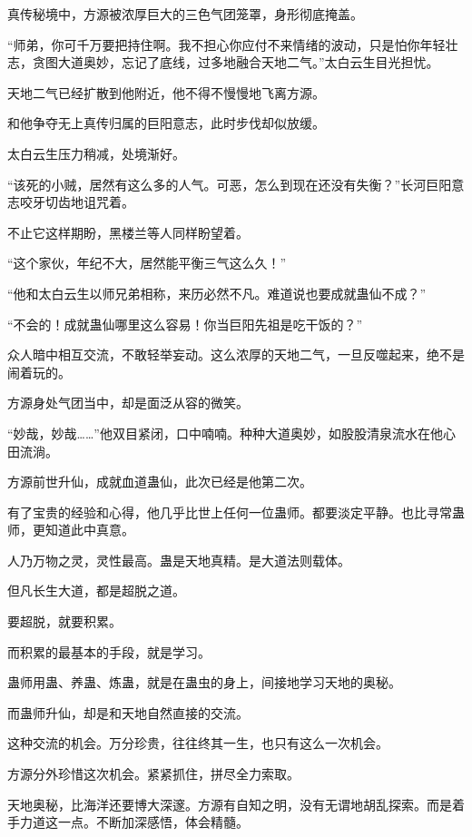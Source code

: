 
\begin{this_body}

真传秘境中，方源被浓厚巨大的三色气团笼罩，身形彻底掩盖。

“师弟，你可千万要把持住啊。我不担心你应付不来情绪的波动，只是怕你年轻壮志，贪图大道奥妙，忘记了底线，过多地融合天地二气。”太白云生目光担忧。

天地二气已经扩散到他附近，他不得不慢慢地飞离方源。

和他争夺无上真传归属的巨阳意志，此时步伐却似放缓。

太白云生压力稍减，处境渐好。

“该死的小贼，居然有这么多的人气。可恶，怎么到现在还没有失衡？”长河巨阳意志咬牙切齿地诅咒着。

不止它这样期盼，黑楼兰等人同样盼望着。

“这个家伙，年纪不大，居然能平衡三气这么久！”

“他和太白云生以师兄弟相称，来历必然不凡。难道说也要成就蛊仙不成？”

“不会的！成就蛊仙哪里这么容易！你当巨阳先祖是吃干饭的？”

众人暗中相互交流，不敢轻举妄动。这么浓厚的天地二气，一旦反噬起来，绝不是闹着玩的。

方源身处气团当中，却是面泛从容的微笑。

“妙哉，妙哉……”他双目紧闭，口中喃喃。种种大道奥妙，如股股清泉流水在他心田流淌。

方源前世升仙，成就血道蛊仙，此次已经是他第二次。

有了宝贵的经验和心得，他几乎比世上任何一位蛊师。都要淡定平静。也比寻常蛊师，更知道此中真意。

人乃万物之灵，灵性最高。蛊是天地真精。是大道法则载体。

但凡长生大道，都是超脱之道。

要超脱，就要积累。

而积累的最基本的手段，就是学习。

蛊师用蛊、养蛊、炼蛊，就是在蛊虫的身上，间接地学习天地的奥秘。

而蛊师升仙，却是和天地自然直接的交流。

这种交流的机会。万分珍贵，往往终其一生，也只有这么一次机会。

方源分外珍惜这次机会。紧紧抓住，拼尽全力索取。

天地奥秘，比海洋还要博大深邃。方源有自知之明，没有无谓地胡乱探索。而是着手力道这一点。不断加深感悟，体会精髓。


\end{this_body}
